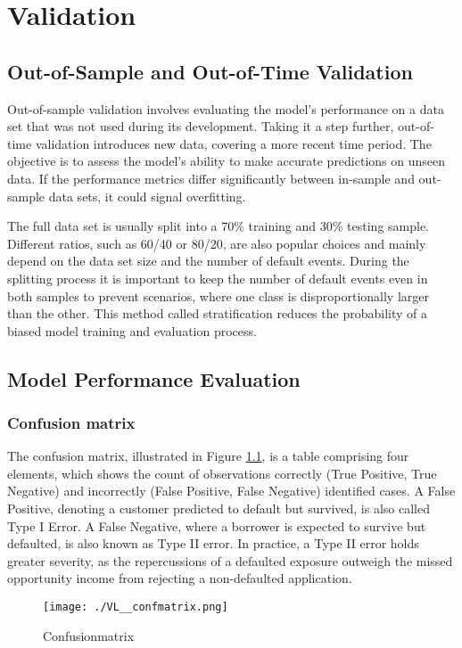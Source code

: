 \chapter{Validation}
\label{ch:VL}

\section{Out-of-Sample and Out-of-Time Validation}
Out-of-sample validation involves evaluating the model's performance on a data set that was not used during its development. Taking it a step further, out-of-time validation introduces new data, covering a more recent time period. The objective is to assess the model's ability to make accurate predictions on unseen data. If the performance metrics differ significantly between in-sample and out-sample data sets, it could signal overfitting. 

The full data set is usually split into a 70\% training and 30\% testing sample. Different ratios, such as 60/40 or 80/20, are also popular choices and mainly depend on the data set size and the number of default events. During the splitting process it is important to keep the number of default events even in both samples to prevent scenarios, where one class is disproportionally larger than the other. This method called stratification reduces the probability of a biased model training and evaluation process.

\section{Model Performance Evaluation}

\subsection{Confusion matrix}
The confusion matrix, illustrated in Figure \ref{fig:vl_confmatr}, is a table comprising four elements, which shows the count of observations correctly (True Positive, True Negative) and incorrectly (False Positive, False Negative) identified cases. A False Positive, denoting a customer predicted to default but survived, is also called Type I Error. A False Negative, where a borrower is expected to survive but defaulted, is also known as Type II error. In practice, a Type II error holds greater severity, as the repercussions of a defaulted exposure outweigh the missed opportunity income from rejecting a non-defaulted application.

\begin{figure}[H]
	\centering
	\texttt{[image: ./VL\_\_confmatrix.png]}
    \caption{Confusionmatrix}
    \label{fig:vl_confmatr}
\end{figure}

